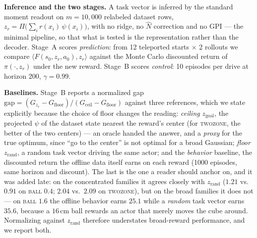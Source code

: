 \documentclass[10pt]{article}
\begin{document}
\textbf{Inference and the two stages.} A task vector is inferred by the standard
moment readout on $m{=}10{,}000$ relabeled dataset rows,
$z_r = \Pi\big(\sum_i r(x_i)\,\psi(x_i)\big)$, with no ridge, no $\hat N$
correction and no GPI --- the minimal pipeline, so that what is tested is the
representation rather than the decoder. Stage~A scores \emph{prediction}: from 12
teleported starts $\times$ 2 rollouts we compare $\langle F(s_0,z_r,a_0),z_r\rangle$
against the Monte Carlo discounted return of $\pi(\cdot,z_r)$ under the new
reward. Stage~B scores \emph{control}: 10 episodes per drive at horizon 200,
$\gamma=0.99$.

\textbf{Baselines.} Stage~B reports a normalized gap
$\mathrm{gap} = (G_{z_r}-G_{\text{floor}})/(G_{\text{ceil}}-G_{\text{floor}})$
against three references, which we state explicitly because the choice of floor
changes the reading:
\emph{ceiling} $z_{\text{goal}}$, the projected $\psi$ of the dataset state
nearest the reward's center (for \textsc{twozone}, the better of the two centers)
--- an oracle handed the answer, and a \emph{proxy} for the true optimum, since
``go to the center'' is not optimal for a broad Gaussian;
\emph{floor} $z_{\text{rand}}$, a random task vector driving the same actor;
and the \emph{behavior} baseline, the discounted return the offline data itself
earns on each reward (1000 episodes, same horizon and discount).
The last is the one a reader should anchor on, and it was added late: on the
concentrated families it agrees closely with $z_{\text{rand}}$ ($1.21$ vs.\ $0.91$
on \textsc{ball} $0.4$; $2.04$ vs.\ $2.09$ on \textsc{twozone}), but on the broad
families it does not --- on \textsc{ball} $1.6$ the offline behavior earns $25.1$
while a \emph{random} task vector earns $35.6$, because a $16$\,cm ball rewards an
actor that merely moves the cube around. Normalizing against $z_{\text{rand}}$
therefore understates broad-reward performance, and we report both.
\end{document}
